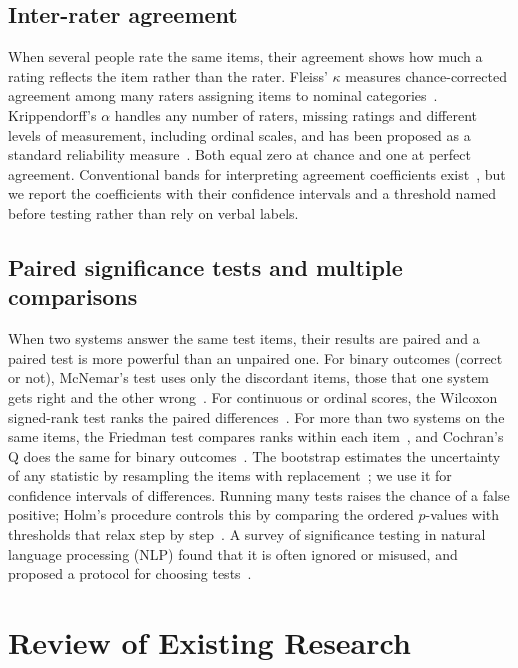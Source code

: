 \subsection{Inter-rater agreement}
\label{sec:prelim-agreement}

When several people rate the same items, their agreement shows how much a rating reflects the item rather than the rater. Fleiss' $\kappa$ measures chance-corrected agreement among many raters assigning items to nominal categories~\cite{fleiss1971measuring}. Krippendorff's $\alpha$ handles any number of raters, missing ratings and different levels of measurement, including ordinal scales, and has been proposed as a standard reliability measure~\cite{hayes2007answering}. Both equal zero at chance and one at perfect agreement. Conventional bands for interpreting agreement coefficients exist~\cite{landis1977measurement}, but we report the coefficients with their confidence intervals and a threshold named before testing rather than rely on verbal labels.

\subsection{Paired significance tests and multiple comparisons}
\label{sec:prelim-stats}

When two systems answer the same test items, their results are paired and a paired test is more powerful than an unpaired one. For binary outcomes (correct or not), McNemar's test uses only the discordant items, those that one system gets right and the other wrong~\cite{mcnemar1947note}. For continuous or ordinal scores, the Wilcoxon signed-rank test ranks the paired differences~\cite{wilcoxon1945individual}. For more than two systems on the same items, the Friedman test compares ranks within each item~\cite{friedman1937use}, and Cochran's Q does the same for binary outcomes~\cite{cochran1950comparison}. The bootstrap estimates the uncertainty of any statistic by resampling the items with replacement~\cite{efron1979bootstrap}; we use it for confidence intervals of differences. Running many tests raises the chance of a false positive; Holm's procedure controls this by comparing the ordered $p$-values with thresholds that relax step by step~\cite{holm1979simple}. A survey of significance testing in natural language processing (NLP) found that it is often ignored or misused, and proposed a protocol for choosing tests~\cite{dror2018hitchhiker}.

\section{Review of Existing Research}
\label{sec:review}

